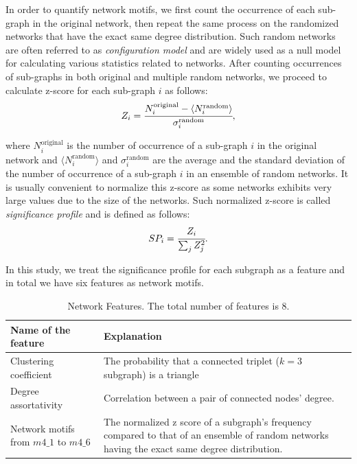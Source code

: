 \documentclass{article}
\begin{document}
In order to quantify network motifs, we first count the occurrence of each sub-graph in the original network, then repeat the same process on the randomized networks that have the exact same degree distribution. Such random networks are often referred to as \textit{configuration model} and are widely used as a null model for calculating various statistics related to networks. After counting occurrences of sub-graphs in both original and multiple random networks, we proceed to calculate z-score for each sub-graph $i$ as follows:
	\begin{equation}
	Z_i = \cfrac{N_i^{\text{original}} - \langle N_i^{\text{random}} \rangle }{\sigma_i^{\text{random}}},
	\end{equation}

where $N_i^{\text{original}}$ is the number of occurrence of a sub-graph $i$ in the original network and $ \langle N_i^{\text{random}} \rangle$ and $\sigma_i^{\text{random}}$ are the average and the standard deviation of the number of occurrence of a sub-graph $i$ in an ensemble of random networks. It is usually convenient to normalize this z-score as some networks exhibits very large values due to the size of the networks. Such normalized z-score is called \textit{significance profile} and is defined as follows:
	\begin{equation}
	SP_i = \cfrac{Z_i}{\sum_j Z_j^2}.
	\end{equation}
	
In this study, we treat the significance profile for each subgraph as a feature and in total we have six features as network motifs.
\newline



\begin{table}[htb]
  \begin{center}
    \caption{Network Features. The total number of features is $8$.}
    \begin{tabular}{| l | p{8cm} |} \hline
      Name of the feature & Explanation  \\ \hline \hline
      Clustering coefficient &  The probability that a connected triplet ($k=3$ subgraph) is a triangle \\  %
      Degree assortativity &  Correlation between a pair of connected nodes' degree. \\  %
      Network motifs from $m4\_1$ to  $m4\_6$& The normalized z score of a subgraph's frequency compared to that of an ensemble of random networks having the exact same degree distribution. \\ \hline
    \end{tabular}
    \label{tab:feature}
  \end{center}
\end{table}
\end{document}
